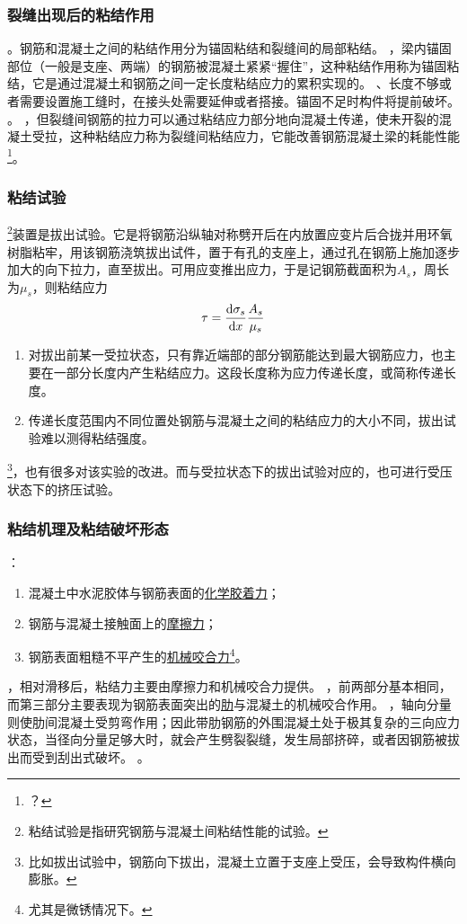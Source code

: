 \documentclass{article}
\begin{document}
\subsubsection{裂缝出现后的粘结作用}
。钢筋和混凝土之间的粘结作用分为锚固粘结和裂缝间的局部粘结。
，梁内锚固部位（一般是支座、两端）的钢筋被混凝土紧紧“握住”，这种粘结作用称为锚固粘结，它是通过混凝土和钢筋之间一定长度粘结应力的累积实现的。
、长度不够或者需要设置施工缝时，在接头处需要延伸或者搭接。锚固不足时构件将提前破坏。
。
，但裂缝间钢筋的拉力可以通过粘结应力部分地向混凝土传递，使未开裂的混凝土受拉，这种粘结应力称为裂缝间粘结应力，它能改善钢筋混凝土梁的耗能性能\footnote{？}。
\subsubsection{粘结试验}
\footnote{粘结试验是指研究钢筋与混凝土间粘结性能的试验。}装置是拔出试验。它是将钢筋沿纵轴对称劈开后在内放置应变片后合拢并用环氧树脂粘牢，用该钢筋浇筑拔出试件，置于有孔的支座上，通过孔在钢筋上施加逐步加大的向下拉力，直至拔出。可用应变推出应力，于是记钢筋截面积为$A_s$，周长为$\mu_s$，则粘结应力
$$\tau=\derivative{\sigma_s}{x}\frac{A_s}{\mu_s}$$
\begin{enumerate}
    \item 对拔出前某一受拉状态，只有靠近端部的部分钢筋能达到最大钢筋应力，也主要在一部分长度内产生粘结应力。这段长度称为应力传递长度，或简称传递长度。
    \item 传递长度范围内不同位置处钢筋与混凝土之间的粘结应力的大小不同，拔出试验难以测得粘结强度。
\end{enumerate}
\footnote{比如拔出试验中，钢筋向下拔出，混凝土立置于支座上受压，会导致构件横向膨胀。}，也有很多对该实验的改进。而与受拉状态下的拔出试验对应的，也可进行受压状态下的挤压试验。
\subsubsection{粘结机理及粘结破坏形态}
：
\begin{enumerate}
    \item 混凝土中水泥胶体与钢筋表面的\underline{化学胶着力}；
    \item 钢筋与混凝土接触面上的\underline{摩擦力}；
    \item 钢筋表面粗糙不平产生的\underline{机械咬合力}\footnote{尤其是微锈情况下。}。
\end{enumerate}
，相对滑移后，粘结力主要由摩擦力和机械咬合力提供。
，前两部分基本相同，而第三部分主要表现为钢筋表面突出的\underline{肋}与混凝土的机械咬合作用。
，轴向分量则使肋间混凝土受剪弯作用；因此带肋钢筋的外围混凝土处于极其复杂的三向应力状态，当径向分量足够大时，就会产生劈裂裂缝，发生局部挤碎，或者因钢筋被拔出而受到刮出式破坏。
。
\end{document}
